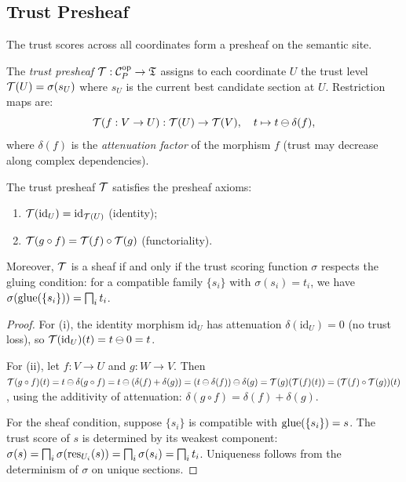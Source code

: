 \documentclass[11pt]{article}
\newcommand{\ProofScore}{\sigma}
\begin{document}
\subsection{Trust Presheaf}\label{subsec:trust-presheaf}

The trust scores across all coordinates form a presheaf on the
semantic site.

\begin{definition}\label{def:trust-presheaf}
The \emph{trust presheaf} $\mathcal{T} : \mathcal{C}_P^{\mathrm{op}} \to \mathfrak{T}$
assigns to each coordinate $U$ the trust level
$\trust(U) = \ProofScore(s_U)$ where $s_U$ is the current best
candidate section at $U$.  Restriction maps are:
\[
  \mathcal{T}(f : V \to U) : \mathcal{T}(U) \to \mathcal{T}(V), \quad
  t \mapsto t \ominus \delta(f),
\]
where $\delta(f)$ is the \emph{attenuation factor} of the morphism $f$
(trust may decrease along complex dependencies).
\end{definition}

\begin{theorem}\label{thm:trust-presheaf}
The trust presheaf $\mathcal{T}$ satisfies the presheaf axioms:
\begin{enumerate}[label=(\roman*)]
  \item $\mathcal{T}(\mathrm{id}_U) = \mathrm{id}_{\mathcal{T}(U)}$ (identity);
  \item $\mathcal{T}(g \circ f) = \mathcal{T}(f) \circ \mathcal{T}(g)$ (functoriality).
\end{enumerate}
Moreover, $\mathcal{T}$ is a sheaf if and only if the trust scoring function
$\ProofScore$ respects the gluing condition: for a compatible family
$\{s_i\}$ with $\ProofScore(s_i) = t_i$, we have
$\ProofScore(\glue(\{s_i\})) = \bigsqcap_i t_i$.
\end{theorem}

\begin{proof}
For (i), the identity morphism $\mathrm{id}_U$ has attenuation
$\delta(\mathrm{id}_U) = 0$ (no trust loss), so
$\mathcal{T}(\mathrm{id}_U)(t) = t \ominus 0 = t$.

For (ii), let $f : V \to U$ and $g : W \to V$.  Then
$\mathcal{T}(g \circ f)(t) = t \ominus \delta(g \circ f)
= t \ominus (\delta(f) + \delta(g))
= (t \ominus \delta(f)) \ominus \delta(g)
= \mathcal{T}(g)(\mathcal{T}(f)(t))
= (\mathcal{T}(f) \circ \mathcal{T}(g))(t)$,
using the additivity of attenuation: $\delta(g \circ f) =
\delta(f) + \delta(g)$.

For the sheaf condition, suppose $\{s_i\}$ is compatible with
$\mathrm{glue}(\{s_i\}) = s$.  The trust score of $s$ is determined by its
weakest component: $\ProofScore(s) = \bigsqcap_i \ProofScore(\res_{U_i}(s))
= \bigsqcap_i \ProofScore(s_i) = \bigsqcap_i t_i$.  Uniqueness follows
from the determinism of $\ProofScore$ on unique sections.
\end{proof}
\end{document}
